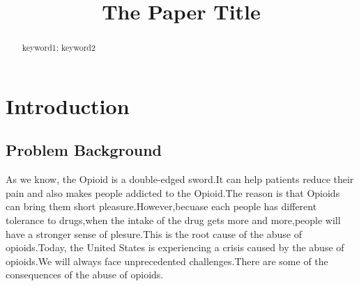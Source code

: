 \documentclass{mcmthesis}
\title{The Paper Title}
\begin{document}
\begin{abstract}
\begin{keywords}
keyword1; keyword2
\end{keywords}
\end{abstract}
\maketitle
\tableofcontents
\newpage  %


\section{Introduction}
\subsection{Problem Background} %
As we know, the Opioid is a double-edged sword.It can help patients reduce their pain and also makes people addicted to the Opioid.The reason is that Opioids can bring them short pleasure.However,becuase each people has different tolerance to drugs,when the intake of the drug gets more and more,people will have a stronger sense of plesure.This is the root cause of the abuse of opioids.Today, the United States is experiencing a crisis caused by the abuse of opioids.We will always face unprecedented challenges.There are some of the consequences of the abuse of opioids.
\end{document}
